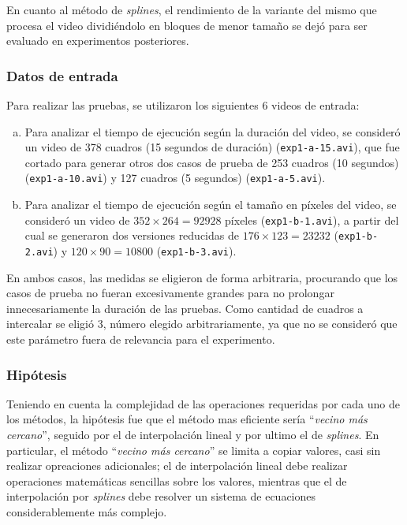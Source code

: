             En cuanto al método de \emph{splines}, el rendimiento de la variante del mismo que procesa el video dividiéndolo en bloques de menor tamaño se dejó para ser evaluado en experimentos posteriores.

        \subsubsection*{Datos de entrada}

            Para realizar las pruebas, se utilizaron los siguientes 6 videos de entrada:

            \begin{enumerate}[(a)]
                \item Para analizar el tiempo de ejecución según la duración del video, se consideró un video de 378 cuadros (15 segundos de duración) (\texttt{exp1-a-15.avi}), que fue cortado para generar otros dos casos de prueba de 253 cuadros (10 segundos) (\texttt{exp1-a-10.avi}) y 127 cuadros (5 segundos) (\texttt{exp1-a-5.avi}).
                \item Para analizar el tiempo de ejecución según el tamaño en píxeles del video, se consideró un video de $352 \times 264 = 92928$ píxeles (\texttt{exp1-b-1.avi}), a partir del cual se generaron dos versiones reducidas de $176 \times 123 = 23232$ (\texttt{exp1-b-2.avi}) y $ 120 \times 90 = 10800$ (\texttt{exp1-b-3.avi}).
            \end{enumerate}

            En ambos casos, las medidas se eligieron de forma arbitraria, procurando que los casos de prueba no fueran excesivamente grandes para no prolongar innecesariamente la duración de las pruebas. Como cantidad de cuadros a intercalar se eligió 3, número elegido arbitrariamente, ya que no se consideró que este parámetro fuera de relevancia para el experimento.

        \subsubsection*{Hipótesis}

            Teniendo en cuenta la complejidad de las operaciones requeridas por cada uno de los métodos, la hipótesis fue que el método mas eficiente sería ``\emph{vecino más cercano}'', seguido por el de interpolación lineal y por ultimo el de \emph{splines}. En particular, el método ``\emph{vecino más cercano}'' se limita a copiar valores, casi sin realizar opreaciones adicionales; el de interpolación lineal debe realizar operaciones matemáticas sencillas sobre los valores, mientras que el de interpolación por \emph{splines} debe resolver un sistema de ecuaciones considerablemente más complejo.

